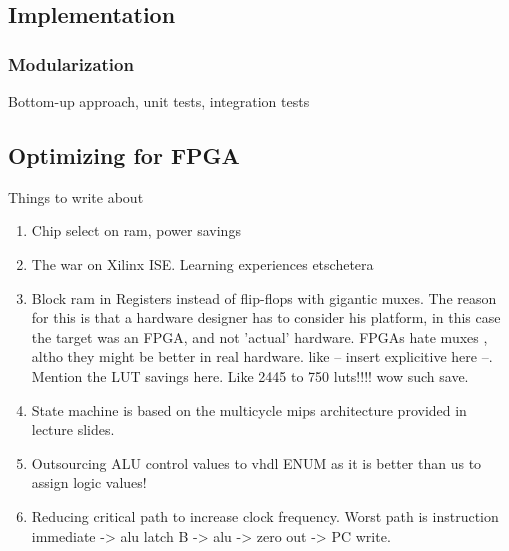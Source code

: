 \subsection{Implementation}

\subsubsection{Modularization}

Bottom-up approach, unit tests, integration tests

\subsection{Optimizing for FPGA}


Things to write about

\begin{enumerate}
  \item
    Chip select on ram, power savings

  \item
    The war on Xilinx ISE. Learning experiences etschetera

  \item
    Block ram in Registers instead of flip-flops with gigantic muxes. The reason for this is that a hardware designer has to consider his platform, in this case the target was an FPGA, and not 'actual' hardware. FPGAs hate muxes , altho they might be better in real hardware. like -- insert explicitive here --. Mention the LUT savings here. Like 2445 to 750 luts!!!! wow such save.

  \item
    State machine is based on the multicycle mips architecture provided in lecture slides.

  \item
    Outsourcing ALU control values to vhdl ENUM as it is better than us to assign logic values!

  \item
    Reducing critical path to increase clock frequency. Worst path is instruction immediate -> alu latch B -> alu -> zero out -> PC write.


\end{enumerate}
